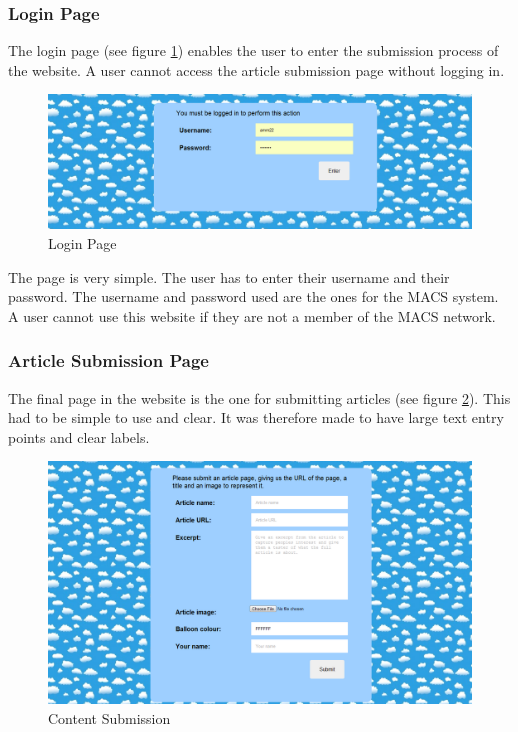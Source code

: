 \subsubsection{Login Page}
The login page (see figure \ref{Login}) enables the user to enter the submission process of the website. A user cannot access the article submission page without logging in. 

\begin{figure}
\begin{centering}
\includegraphics[width=\textwidth]{Diagrams/Website-Login}
\par\end{centering}

\caption{Login Page}
\label{Login}
\end{figure}

The page is very simple. The user has to enter their username and their password. The username and password used are the ones for the MACS system. A user cannot use this website if they are not a member of the MACS network. 

\subsubsection{Article Submission Page}
The final page in the website is the one for submitting articles (see figure \ref{ContentSubmission}). This had to be simple to use and clear. It was therefore made to have large text entry points and clear labels.

\begin{figure}
\begin{centering}
\includegraphics[width=\textwidth]{Diagrams/Website-Submission}
\par\end{centering}

\caption{Content Submission}
\label{ContentSubmission}
\end{figure}

